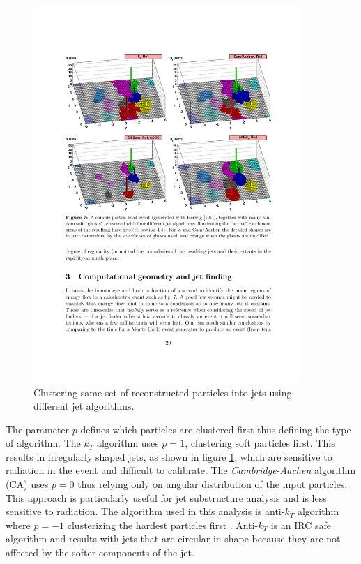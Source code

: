 \begin{figure}[htbp]
	\centering
		\includegraphics[width=0.9\textwidth]{Figures/diff_algos.pdf}
	\caption[Clustering particles into jets with different algorithms.]{Clustering same set of reconstructed particles into jets using different jet algorithms. \cite{Salam:2009jx}}
	\label{fig:jetAlgos}
\end{figure}
\par The parameter $p$ defines which particles are clustered first thus defining the type of algorithm. The $k_T$ algorithm uses $p=1$, clustering soft particles first. This results in irregularly shaped jets, as shown in figure \ref{fig:jetAlgos}, which are sensitive to radiation in the event and difficult to calibrate. The \textit{Cambridge-Aachen} algorithm (CA) uses $p=0$ thus relying only on angular distribution of the input particles. This approach is particularly useful for jet substructure analysis and is less sensitive to radiation. The algorithm used in this analysis is anti-$k_T$ algorithm where $p=-1$ clusterizing the hardest particles first \cite{Cacciari:2008gp}. Anti-$k_T$ is an IRC safe algorithm and results with jets that are circular in shape because they are not affected by the softer components of the jet.       


